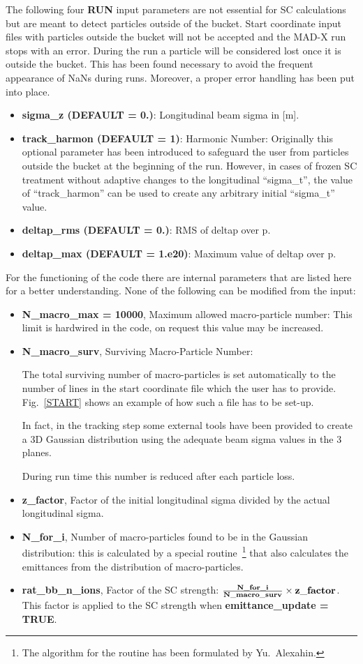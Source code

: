The following four {\bf RUN} input parameters are not essential for SC
calculations but are meant to detect particles outside of the
bucket. Start coordinate input files with particles outside the bucket
will not be accepted and the MAD-X run stops with an error. During the
run a particle will be considered lost once it is outside the bucket.
This has been found necessary to avoid the frequent appearance of NaNs
during runs. Moreover, a proper error handling has been put into
place.

\begin{itemize}
\item {\bf sigma\_z (DEFAULT = 0.)}: Longitudinal beam sigma in [m].
\item {\bf track\_harmon (DEFAULT = 1)}: Harmonic Number: Originally
  this optional parameter has been introduced to safeguard the user
  from particles outside the bucket at the beginning of the
  run. However, in cases of frozen SC treatment without adaptive
  changes to the longitudinal ``sigma\_t'', the value of
  ``track\_harmon'' can be used to create any arbitrary initial
  ``sigma\_t'' value.
\item {\bf deltap\_rms (DEFAULT = 0.)}: RMS of deltap over p.
\item {\bf deltap\_max (DEFAULT = 1.e20)}: Maximum value of deltap
  over p.
\end{itemize}

For the functioning of the code there are internal parameters that are
listed here for a better understanding. None of the following can be
modified from the input:
\begin{itemize}
\item {\bf N\_macro\_max = 10000}, Maximum allowed macro-particle
  number: This limit is hardwired in the code, on request this value
  may be increased.
\item {\bf N\_macro\_surv}, Surviving Macro-Particle Number:

  The total surviving number of macro-particles is set automatically
  to the number of lines in the start coordinate file which the user
  has to provide. Fig.~\ref{START} shows an example of how such a file
  has to be set-up.

  In fact, in the tracking step some external tools have been provided
  to create a 3D Gaussian distribution using the adequate beam sigma
  values in the 3 planes.

  During run time this number is reduced after each particle loss.
\item {\bf z\_factor}, Factor of the initial longitudinal sigma
  divided by the actual longitudinal sigma.
\item {\bf N\_for\_i}, Number of macro-particles found to be in the
  Gaussian distribution: this is calculated by a special
  routine~\footnote{The algorithm for the routine has been formulated
    by Yu.~Alexahin.}  that also calculates the emittances from the
  distribution of macro-particles.
\item {\bf rat\_bb\_n\_ions}, Factor of the SC strength: $\frac{\bf
  N\_for\_i}{\bf N\_macro\_surv}\times {\bf z\_factor}$. This factor
  is applied to the SC strength when {\bf emittance\_update = TRUE}.
\end{itemize}

